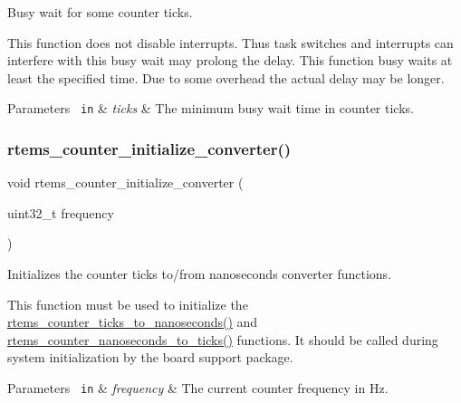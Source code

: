 Busy wait for some counter ticks. 

This function does not disable interrupts. Thus task switches and interrupts can interfere with this busy wait may prolong the delay. This function busy waits at least the specified time. Due to some overhead the actual delay may be longer.


\begin{DoxyParams}[1]{Parameters}
\mbox{\texttt{ in}}  & {\em ticks} & The minimum busy wait time in counter ticks. \\
\hline
\end{DoxyParams}
\mbox{\label{group__ClassicCounter_gac05da1fad44ca8d492d00b3890b80415}} 
\subsubsection{\texorpdfstring{rtems\_counter\_initialize\_converter()}{rtems\_counter\_initialize\_converter()}}
{\footnotesize\ttfamily void rtems\+\_\+counter\+\_\+initialize\+\_\+converter (\begin{DoxyParamCaption}\item[{uint32\+\_\+t}]{frequency }\end{DoxyParamCaption})}



Initializes the counter ticks to/from nanoseconds converter functions. 

This function must be used to initialize the \mbox{\hyperlink{group__ClassicCounter_ga3e50a042e60bfcafdff5dbd46cad8947}{rtems\+\_\+counter\+\_\+ticks\+\_\+to\+\_\+nanoseconds()}} and \mbox{\hyperlink{group__ClassicCounter_ga9a475dea5b0d7689a94f0806cf21f396}{rtems\+\_\+counter\+\_\+nanoseconds\+\_\+to\+\_\+ticks()}} functions. It should be called during system initialization by the board support package.


\begin{DoxyParams}[1]{Parameters}
\mbox{\texttt{ in}}  & {\em frequency} & The current counter frequency in Hz. \\
\hline
\end{DoxyParams}
\mbox{\label{group__ClassicCounter_ga9a475dea5b0d7689a94f0806cf21f396}} 
